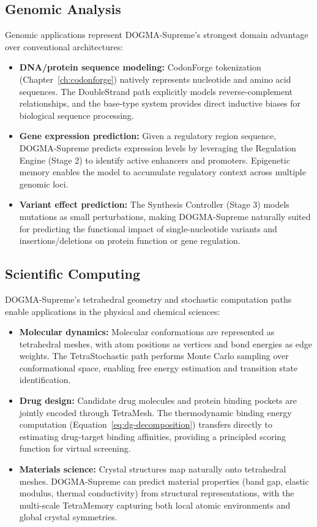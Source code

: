 \subsection{Genomic Analysis}
\label{sec:app-genomic}

Genomic applications represent DOGMA-Supreme's strongest domain advantage over conventional architectures:

\begin{itemize}[leftmargin=1.8em]
  \item \textbf{DNA/protein sequence modeling:} CodonForge tokenization (Chapter~\ref{ch:codonforge}) natively represents nucleotide and amino acid sequences. The DoubleStrand path explicitly models reverse-complement relationships, and the base-type system provides direct inductive biases for biological sequence processing.
  \item \textbf{Gene expression prediction:} Given a regulatory region sequence, DOGMA-Supreme predicts expression levels by leveraging the Regulation Engine (Stage 2) to identify active enhancers and promoters. Epigenetic memory enables the model to accumulate regulatory context across multiple genomic loci.
  \item \textbf{Variant effect prediction:} The Synthesis Controller (Stage 3) models mutations as small perturbations, making DOGMA-Supreme naturally suited for predicting the functional impact of single-nucleotide variants and insertions/deletions on protein function or gene regulation.
\end{itemize}

\subsection{Scientific Computing}
\label{sec:app-scientific}

DOGMA-Supreme's tetrahedral geometry and stochastic computation paths enable applications in the physical and chemical sciences:

\begin{itemize}[leftmargin=1.8em]
  \item \textbf{Molecular dynamics:} Molecular conformations are represented as tetrahedral meshes, with atom positions as vertices and bond energies as edge weights. The TetraStochastic path performs Monte Carlo sampling over conformational space, enabling free energy estimation and transition state identification.
  \item \textbf{Drug design:} Candidate drug molecules and protein binding pockets are jointly encoded through TetraMesh. The thermodynamic binding energy computation (Equation~\ref{eq:dg-decomposition}) transfers directly to estimating drug-target binding affinities, providing a principled scoring function for virtual screening.
  \item \textbf{Materials science:} Crystal structures map naturally onto tetrahedral meshes. DOGMA-Supreme can predict material properties (band gap, elastic modulus, thermal conductivity) from structural representations, with the multi-scale TetraMemory capturing both local atomic environments and global crystal symmetries.
\end{itemize}

